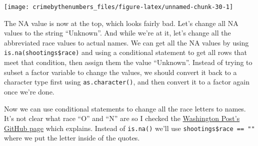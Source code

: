\documentclass[
  12pt,
  openany]{book}
\newenvironment{Shaded}{\begin{snugshade}}{\end{snugshade}}
\newcommand{\FunctionTok}[1]{\textcolor[rgb]{0,0,0}{#1}}
\newcommand{\NormalTok}[1]{#1}
\newcommand{\OtherTok}[1]{\textcolor[rgb]{0.37,0.37,0.37}{#1}}
\newcommand{\SpecialCharTok}[1]{\textcolor[rgb]{0,0,0}{#1}}
\newcommand{\StringTok}[1]{\textcolor[rgb]{0.5,0.5,0.5}{#1}}
\begin{document}
\begin{center}\texttt{[image: crimebythenumbers\_files/figure-latex/unnamed-chunk-30-1]} \end{center}

The NA value is now at the top, which looks fairly bad. Let's change all NA values to the string ``Unknown''. And while we're at it, let's change all the abbreviated race values to actual names. We can get all the NA values by using \texttt{is.na(shootings\$race)} and using a conditional statement to get all rows that meet that condition, then assign them the value ``Unknown''. Instead of trying to subset a factor variable to change the values, we should convert it back to a character type first using \texttt{as.character()}, and then convert it to a factor again once we're done.

\begin{Shaded}
\end{Shaded}

Now we can use conditional statements to change all the race letters to names. It's not clear what race ``O'' and ``N'' are so I checked the \href{https://github.com/washingtonpost/data-police-shootings}{Washington Post's GitHub page} which explains. Instead of \texttt{is.na()} we'll use \texttt{shootings\$race\ ==\ ""} where we put the letter inside of the quotes.

\begin{Shaded}
\end{Shaded}
\end{document}
